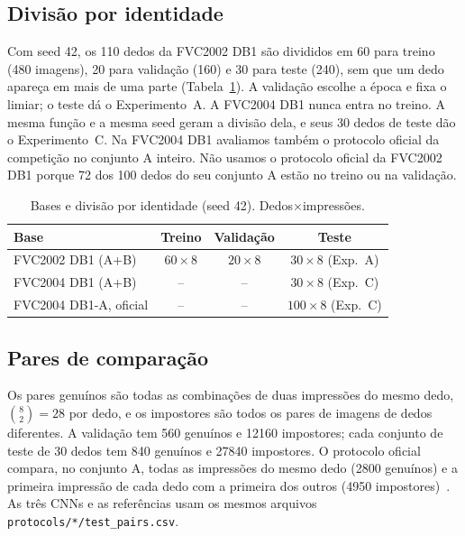 \documentclass[conference]{IEEEtran}
\begin{document}
\subsection{Divisão por identidade}

Com seed 42, os 110 dedos da FVC2002 DB1 são divididos em 60 para treino (480 imagens), 20 para validação (160) e 30 para teste (240), sem que um dedo apareça em mais de uma parte (Tabela~\ref{tab:bases}). A validação escolhe a época e fixa o limiar; o teste dá o Experimento~A. A FVC2004 DB1 nunca entra no treino. A mesma função e a mesma seed geram a divisão dela, e seus 30 dedos de teste dão o Experimento~C. Na FVC2004 DB1 avaliamos também o protocolo oficial da competição no conjunto A inteiro. Não usamos o protocolo oficial da FVC2002 DB1 porque 72 dos 100 dedos do seu conjunto A estão no treino ou na validação.

\begin{table}[t]
\centering
\caption{Bases e divisão por identidade (seed 42). Dedos$\times$impressões.}
\label{tab:bases}
\footnotesize
\setlength{\tabcolsep}{3pt}
\begin{tabular}{@{}lccc@{}}
\toprule
Base & Treino & Validação & Teste \\
\midrule
FVC2002 DB1 (A+B) & $60\times8$ & $20\times8$ & $30\times8$ (Exp.~A) \\
FVC2004 DB1 (A+B) & -- & -- & $30\times8$ (Exp.~C) \\
FVC2004 DB1-A, oficial & -- & -- & $100\times8$ (Exp.~C) \\
\bottomrule
\end{tabular}
\end{table}

\subsection{Pares de comparação}

Os pares genuínos são todas as combinações de duas impressões do mesmo dedo, $\binom{8}{2}=28$ por dedo, e os impostores são todos os pares de imagens de dedos diferentes. A validação tem 560 genuínos e \num{12160} impostores; cada conjunto de teste de 30 dedos tem 840 genuínos e \num{27840} impostores. O protocolo oficial compara, no conjunto A, todas as impressões do mesmo dedo (\num{2800} genuínos) e a primeira impressão de cada dedo com a primeira dos outros (\num{4950} impostores)~\cite{maio2004fvc2004}. As três CNNs e as referências usam os mesmos arquivos \texttt{protocols/*/test\_pairs.csv}.
\end{document}
